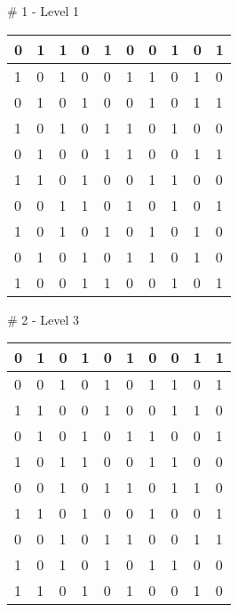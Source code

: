 \# 1 - Level 1 \newline
\begin{tabular}{|m{\collen}|m{\collen}|m{\collen}|m{\collen}|m{\collen}|m{\collen}|m{\collen}|m{\collen}|m{\collen}|m{\collen}|}
\hline
  0 & 1 & 1 & 0 & 1 & 0 & 0 & 1 & 0 & 1 \\
\hline
  1 & 0 & 1 & 0 & 0 & 1 & 1 & 0 & 1 & 0 \\
\hline
  0 & 1 & 0 & 1 & 0 & 0 & 1 & 0 & 1 & 1 \\
\hline
  1 & 0 & 1 & 0 & 1 & 1 & 0 & 1 & 0 & 0 \\
\hline
  0 & 1 & 0 & 0 & 1 & 1 & 0 & 0 & 1 & 1 \\
\hline
  1 & 1 & 0 & 1 & 0 & 0 & 1 & 1 & 0 & 0 \\
\hline
  0 & 0 & 1 & 1 & 0 & 1 & 0 & 1 & 0 & 1 \\
\hline
  1 & 0 & 1 & 0 & 1 & 0 & 1 & 0 & 1 & 0 \\
\hline
  0 & 1 & 0 & 1 & 0 & 1 & 1 & 0 & 1 & 0 \\
\hline
  1 & 0 & 0 & 1 & 1 & 0 & 0 & 1 & 0 & 1 \\
\hline
\end{tabular}


\smallskip

\# 2 - Level 3 \newline
\begin{tabular}{|m{\collen}|m{\collen}|m{\collen}|m{\collen}|m{\collen}|m{\collen}|m{\collen}|m{\collen}|m{\collen}|m{\collen}|}
\hline
  0 & 1 & 0 & 1 & 0 & 1 & 0 & 0 & 1 & 1 \\
\hline
  0 & 0 & 1 & 0 & 1 & 0 & 1 & 1 & 0 & 1 \\
\hline
  1 & 1 & 0 & 0 & 1 & 0 & 0 & 1 & 1 & 0 \\
\hline
  0 & 1 & 0 & 1 & 0 & 1 & 1 & 0 & 0 & 1 \\
\hline
  1 & 0 & 1 & 1 & 0 & 0 & 1 & 1 & 0 & 0 \\
\hline
  0 & 0 & 1 & 0 & 1 & 1 & 0 & 1 & 1 & 0 \\
\hline
  1 & 1 & 0 & 1 & 0 & 0 & 1 & 0 & 0 & 1 \\
\hline
  0 & 0 & 1 & 0 & 1 & 1 & 0 & 0 & 1 & 1 \\
\hline
  1 & 0 & 1 & 0 & 1 & 0 & 1 & 1 & 0 & 0 \\
\hline
  1 & 1 & 0 & 1 & 0 & 1 & 0 & 0 & 1 & 0 \\
\hline
\end{tabular}


\smallskip

